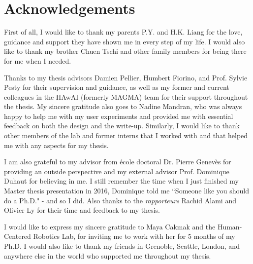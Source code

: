 \chapter*{Acknowledgements}
First of all, I would like to thank my parents P.Y. and H.K. Liang for the love, guidance and support they have shown me in every step of my life.
I would also like to thank my brother Chuen Tschi and other family members for being there for me when I needed.

Thanks to my thesis advisors Damien Pellier, Humbert Fiorino, and Prof. Sylvie Pesty for their supervision and guidance, as well as my former and current colleagues in the HAwAI (formerly MAGMA) team for their support throughout the thesis.
My sincere gratitude also goes to Nadine Mandran, who was always happy to help me with my user experiments and provided me with essential feedback on both the design and the write-up.
Similarly, I would like to thank other members of the lab and former interns that I worked with and that helped me with any aspects for my thesis.

I am also grateful to my advisor from école doctoral Dr. Pierre Genevès for providing an outside perspective and my external advisor Prof. Dominique Duhaut for believing in me.
I still remember the time when I just finished my Master thesis presentation in 2016, Dominique told me ``Someone like you should do a Ph.D." - and so I did.
Also thanks to the \textit{rapporteurs} Rachid Alami and Olivier Ly for their time and feedback to my thesis.

I would like to express my sincere gratitude to Maya Cakmak and the Human-Centered Robotics Lab, for inviting me to work with her for 5 months of my Ph.D.
I would also like to thank my friends in Grenoble, Seattle, London, and anywhere else in the world who supported me throughout my thesis.

